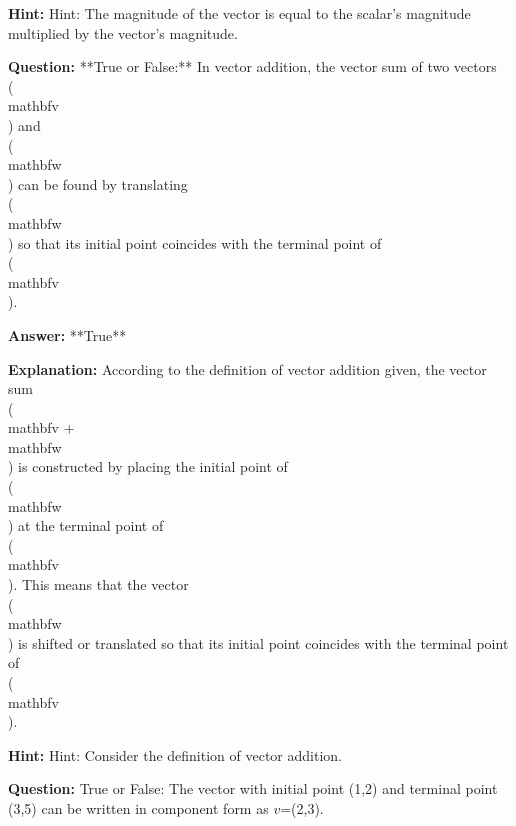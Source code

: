 \documentclass{article}
\begin{document}
                \textbf{Hint:} Hint: The magnitude of the vector is equal to the scalar's magnitude multiplied by the vector's magnitude.
                \vspace{0.5cm} 
        
            
                \textbf {Question:} **True or False:** In vector addition, the vector sum of two vectors \\(\\mathbf{v}\\) and \\(\\mathbf{w}\\) can be found by translating \\(\\mathbf{w}\\) so that its initial point coincides with the terminal point of \\(\\mathbf{v}\\).
                
                \textbf{Answer:} **True**
                
                \textbf{Explanation:} According to the definition of vector addition given, the vector sum \\(\\mathbf{v} + \\mathbf{w}\\) is constructed by placing the initial point of \\(\\mathbf{w}\\) at the terminal point of \\(\\mathbf{v}\\). This means that the vector \\(\\mathbf{w}\\) is shifted or translated so that its initial point coincides with the terminal point of \\(\\mathbf{v}\\).
                
                \textbf{Hint:} Hint: Consider the definition of vector addition.
                \vspace{0.5cm} 
        
            
                \textbf {Question:} True or False: The vector with initial point (1,2) and terminal point (3,5) can be written in component form as $v$=(2,3).
                
\end{document}
